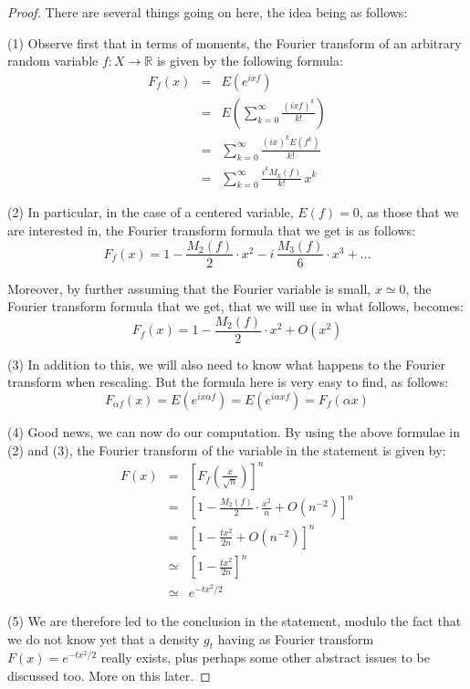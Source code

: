 \documentclass[12pt]{amsbook}
\begin{document}
\begin{proof}
There are several things going on here, the idea being as follows:

\medskip

(1) Observe first that in terms of moments, the Fourier transform of an arbitrary random variable $f:X\to\mathbb R$ is given by the following formula:
\begin{eqnarray*}
F_f(x)
&=&E(e^{ixf})\\
&=&E\left(\sum_{k=0}^\infty\frac{(ixf)^k}{k!}\right)\\
&=&\sum_{k=0}^\infty\frac{(ix)^kE(f^k)}{k!}\\
&=&\sum_{k=0}^\infty\frac{i^kM_k(f)}{k!}\,x^k
\end{eqnarray*}

(2) In particular, in the case of a centered variable, $E(f)=0$, as those that we are interested in, the Fourier transform formula that we get is as follows:
$$F_f(x)=1-\frac{M_2(f)}{2}\cdot x^2-i\,\frac{M_3(f)}{6}\cdot x^3+\ldots$$

Moreover, by further assuming that the Fourier variable is small, $x\simeq0$, the Fourier transform formula that we get, that we will use in what follows, becomes:
$$F_f(x)=1-\frac{M_2(f)}{2}\cdot x^2+O(x^2)$$

(3) In addition to this, we will also need to know what happens to the Fourier transform when rescaling. But the formula here is very easy to find, as follows:
$$F_{\alpha f}(x)
=E(e^{ix\alpha f})
=E(e^{i\alpha xf})
=F_f(\alpha x)$$

(4) Good news, we can now do our computation. By using the above formulae in (2) and (3), the Fourier transform of the variable in the statement is given by:
\begin{eqnarray*}
F(x)
&=&\left[F_f\left(\frac{x}{\sqrt{n}}\right)\right]^n\\
&=&\left[1-\frac{M_2(f)}{2}\cdot\frac{x^2}{n}+O(n^{-2})\right]^n\\
&=&\left[1-\frac{tx^2}{2n}+O(n^{-2})\right]^n\\
&\simeq&\left[1-\frac{tx^2}{2n}\right]^n\\
&\simeq&e^{-tx^2/2}
\end{eqnarray*}

(5) We are therefore led to the conclusion in the statement, modulo the fact that we do not know yet that a density $g_t$ having as Fourier transform $F(x)=e^{-tx^2/2}$ really exists, plus perhaps some other abstract issues to be discussed too. More on this later.
\end{proof}
\end{document}
